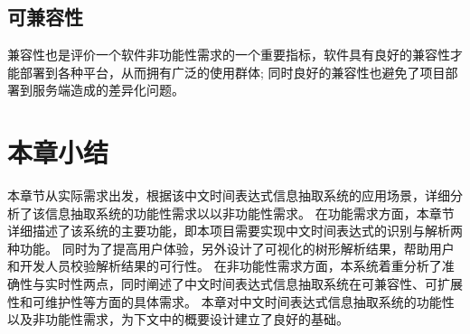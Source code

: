 \subsection{可兼容性}

兼容性也是评价一个软件非功能性需求的一个重要指标，软件具有良好的兼容性才能部署到各种平台，从而拥有广泛的使用群体; 同时良好的兼容性也避免了项目部署到服务端造成的差异化问题。

\section{本章小结}

本章节从实际需求出发，根据该中文时间表达式信息抽取系统的应用场景，详细分析了该信息抽取系统的功能性需求以以非功能性需求。
在功能需求方面，本章节详细描述了该系统的主要功能，即本项目需要实现中文时间表达式的识别与解析两种功能。
同时为了提高用户体验，另外设计了可视化的树形解析结果，帮助用户和开发人员校验解析结果的可行性。
在非功能性需求方面，本系统着重分析了准确性与实时性两点，同时阐述了中文时间表达式信息抽取系统在可兼容性、可扩展性和可维护性等方面的具体需求。
本章对中文时间表达式信息抽取系统的功能性以及非功能性需求，为下文中的概要设计建立了良好的基础。
